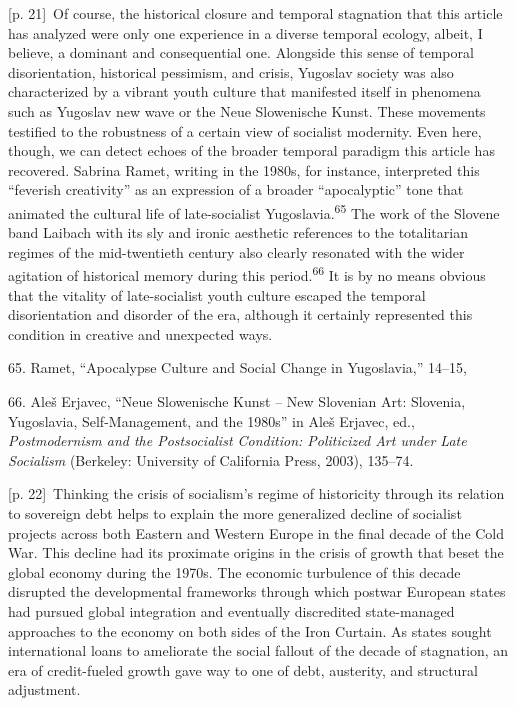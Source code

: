 \documentclass[10pt,a4paper]{article}
\begin{document}
{\scriptsize\color{gray} [p. 21]}\ Of course, the historical closure and temporal stagnation that this article has analyzed were only one experience in a diverse temporal ecology, albeit, I believe, a dominant and consequential one. Alongside this sense of temporal disorientation, historical pessimism, and crisis, Yugoslav society was also characterized by a vibrant youth culture that manifested itself in phenomena such as Yugoslav new wave or the Neue Slowenische Kunst. These movements testified to the robustness of a certain view of socialist modernity. Even here, though, we can detect echoes of the broader temporal paradigm this article has recovered. Sabrina Ramet, writing in the 1980s, for instance, interpreted this “feverish creativity” as an expression of a broader “apocalyptic” tone that animated the cultural life of late-socialist Yugoslavia.\nobreak\textsuperscript{65} The work of the Slovene band Laibach with its sly and ironic aesthetic references to the totalitarian regimes of the mid-twentieth century also clearly resonated with the wider agitation of historical memory during this period.\nobreak\textsuperscript{66} It is by no means obvious that the vitality of late-socialist youth culture escaped the temporal disorientation and disorder of the era, although it certainly represented this condition in creative and unexpected ways.\par{\small 65. Ramet, “Apocalypse Culture and Social Change in Yugoslavia,” 14–15,\par}{\small 66. Aleš Erjavec, “Neue Slowenische Kunst – New Slovenian Art: Slovenia, Yugoslavia, Self-Management, and the 1980s” in Aleš Erjavec, ed., \textit{Postmodernism and the Postsocialist Condition: Politicized Art under Late Socialism} (Berkeley: University of California Press, 2003), 135–74.\par}
{\scriptsize\color{gray} [p. 22]}\ Thinking the crisis of socialism’s regime of historicity through its relation to sovereign debt helps to explain the more generalized decline of socialist projects across both Eastern and Western Europe in the final decade of the Cold War. This decline had its proximate origins in the crisis of growth that beset the global economy during the 1970s. The economic turbulence of this decade disrupted the developmental frameworks through which postwar European states had pursued global integration and eventually discredited state-managed approaches to the economy on both sides of the Iron Curtain. As states sought international loans to ameliorate the social fallout of the decade of stagnation, an era of credit-fueled growth gave way to one of debt, austerity, and structural adjustment.\par
\end{document}
